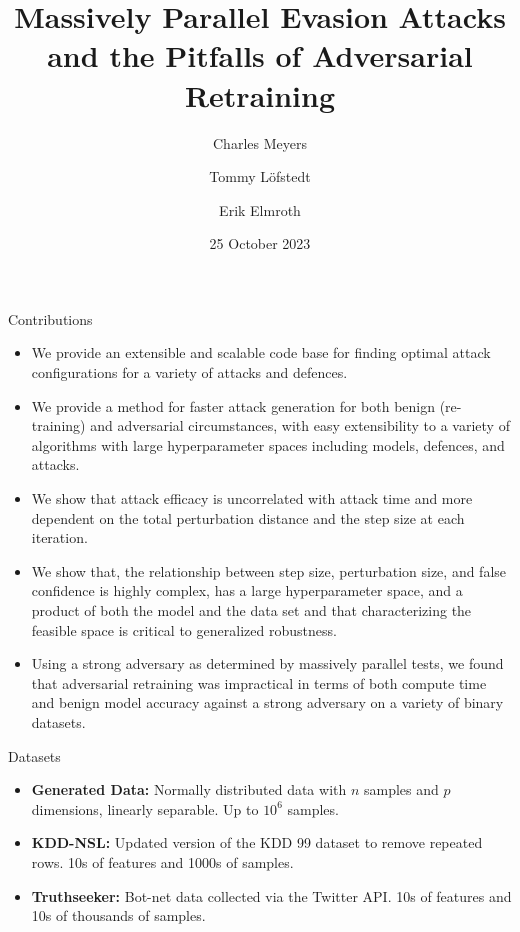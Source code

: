 \documentclass{beamer}
\title{Massively Parallel Evasion Attacks and the Pitfalls of Adversarial Retraining}
\author{Charles Meyers\inst{1} \and
Tommy L\"{o}fstedt\inst{2}  \and
Erik Elmroth\inst{3} }
\institute{ 
Department of Computing Science, Umeå University, Umeå, Sweden \email{cmeyers@cs.umu.se} \and 
\email{tommy@cs.umu.se} \and 
\email{eriks@cs.umu.se}
}
\date{25 October 2023}
\begin{document}
\frame{\titlepage}
\begin{frame}{Contributions}
    \begin{itemize}
    \small
    \item We provide an extensible and scalable code base for finding optimal attack configurations for a variety of attacks and defences.

    \item  We provide a method for faster attack generation for both benign (re-training) and adversarial circumstances, with easy extensibility to a variety of algorithms with large hyperparameter spaces including  models, defences, and attacks.
    
    \item We show that attack efficacy is uncorrelated with attack time and more dependent on the total perturbation distance and the step size at each iteration.

    \item We show that, the relationship between step size, perturbation size, and false confidence is highly complex, has a large hyperparameter space, and a product of both the model and the data set and that characterizing the feasible space is critical to generalized robustness.

    \item Using a strong adversary as determined by massively parallel tests, we found that adversarial retraining was impractical in terms of both compute time and benign model accuracy against a strong adversary on a variety of binary datasets.
    
\end{itemize}
\end{frame}
\begin{frame}{Datasets}
    \begin{itemize}
        \item \textbf{Generated Data:} Normally distributed data with $n$ samples and $p$ dimensions, linearly separable. Up to $10^6$ samples.
        \item \textbf{KDD-NSL:} Updated version of the KDD 99 dataset to remove repeated rows. 10s of features and 1000s of samples.~\cite{kdd-nsl}
        \item \textbf{Truthseeker:} Bot-net data collected via the Twitter API. 10s of features and 10s of thousands of samples.~\cite{truthseeker}
        
    \end{itemize}
\end{frame}
\end{document}
